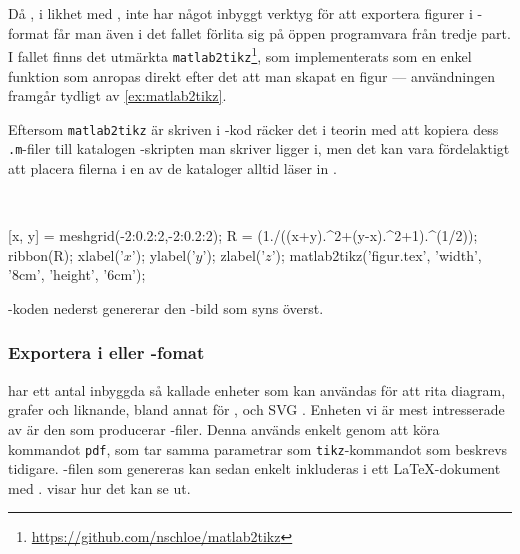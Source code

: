 \documentclass[lang=sv,ptsize=10pt,font=none,nomath,titles=bf,../../a4.tex]{subfiles}
\begin{document}
\label{sec:matlab2tikz}
Då \MATLAB, i likhet med \Rlogo, inte har något inbyggt verktyg för att
exportera figurer i \PGFTikZ-format får man även i det fallet förlita sig
på öppen programvara från tredje part. I fallet \MATLAB finns det utmärkta
\texttt{matlab2tikz}\footnote{\url{https://github.com/nschloe/matlab2tikz}},
som implementerats som en enkel funktion som anropas direkt efter det
att man skapat en figur — användningen framgår tydligt av \cref{ex:matlab2tikz}.

Eftersom \texttt{matlab2tikz} är skriven i \MATLAB-kod räcker det i
teorin med att kopiera dess \texttt{.m}-filer till katalogen
\MATLAB-skripten man skriver ligger i, men det kan vara fördelaktigt att
placera filerna i en av de kataloger \MATLAB alltid läser in
\parencite{MATLAB13:path}.

\begin{kod}[tbp]
	\centering
	\begin{minipage}{\textwidth}
		\centering
		
	\end{minipage}
	\\[2ex]
	\begin{minipage}{\textwidth}
		\begin{matlabcode}
[x, y] = meshgrid(-2:0.2:2,-2:0.2:2);
R = (1./((x+y).^2+(y-x).^2+1).^(1/2));
ribbon(R);
xlabel('$x$'); ylabel('$y$'); zlabel('$z$');
matlab2tikz('figur.tex', 'width', '8cm', 'height', '6cm');
		\end{matlabcode}
	\end{minipage}
	\caption{\MATLAB-koden nederst genererar den \PGFTikZ-bild som
	syns överst.}
	\label{ex:matlab2tikz}
\end{kod}


\subsubsection{Exportera i \PDF eller \PNG-fomat}

\Rlogo har ett antal inbyggda så kallade enheter  som kan
användas för att rita diagram, grafer och liknande, bland annat för \EPS,
\PNG och \textsc{SVG} \parencite[\ppno~675–676]{RCoreTeam12}. Enheten vi är mest
intresserade av är den som producerar \PDF-filer. Denna används enkelt
genom att köra kommandot \texttt{pdf}, som tar samma parametrar som
\texttt{tikz}-kommandot som beskrevs tidigare. \PDF-filen som genereras
kan sedan enkelt inkluderas i ett \LaTeX-dokument med .
 visar hur det kan se ut.
\end{document}
